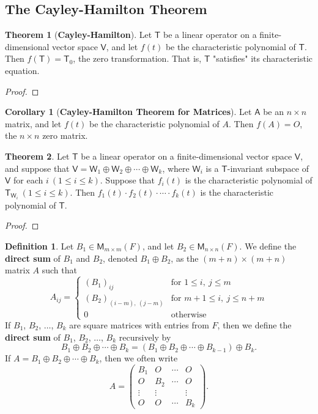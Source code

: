 \documentclass[12pt]{book}
\theoremstyle{definition}
\newtheorem{theorem}{Theorem}[chapter]
\newtheorem*{corollary*}{Corollary}
\newtheorem*{definition}{Definition}
\begin{document}
	\subsection*{The Cayley-Hamilton Theorem}
	\begin{theorem}[\textbf{Cayley-Hamilton}]
		Let $\mathsf{T}$ be a linear operator on a finite-dimensional vector space $\mathsf{V}$, and let $f(t)$ be the characteristic polynomial of $\mathsf{T}$. Then $f(\mathsf{T})=\mathsf{T}_0$, the zero transformation. That is, $\mathsf{T}$ "satisfies" its characteristic equation.
	\end{theorem}
	\begin{proof}
	\end{proof}
	\vspace*{\fill}
	\begin{corollary*}[\textbf{Cayley-Hamilton Theorem for Matrices}]
		Let $\mathsf{A}$ be an $n\times n$ matrix, and let $f(t)$ be the characteristic polynomial of $A$. Then $f(A)=O$, the $n\times n$ zero matrix.
	\end{corollary*}
	\vspace*{\fill}
	\newpage
	\begin{theorem}
		Let $\mathsf{T}$ be a linear operator on a finite-dimensional vector space $\mathsf{V}$, and suppose that $\mathsf{V}=\mathsf{W}_1\oplus\mathsf{W}_2\oplus\cdots\oplus\mathsf{W}_k$, where $\mathsf{W}_i$ is a $\mathsf{T}$-invariant subspace of $\mathsf{V}$ for each $i\ (1\leq i \leq k).$ Suppose that $f_i(t)$ is the characteristic polynomial of $\mathsf{T}_{\mathsf{W}_i}\ (1\leq i \leq k).$ Then $f_1(t)\cdot f_2(t)\cdot \cdots \cdot f_k(t)$ is the characteristic polynomial of $\mathsf{T}$.
	\end{theorem}
	\begin{proof}
	\end{proof}
	\newpage
	\begin{definition}
		Let $B_1\in\mathsf{M}_{m \times m}(F)$, and let $B_2\in\mathsf{M}_{n\times n}(F)$. We define the \textbf{direct sum} of $B_1$ and $B_2$, denoted $B_1\oplus B_2$, as the $(m+n)\times(m+n)$ matrix $A$ such that
		$$A_{ij}=\begin{cases}
			(B_1)_{ij}&\text{for }1\leq i,\ j\leq m\\
			(B_2)_{(i-m),\ (j-m)}&\text{for }m+1\leq i,\ j\leq n+m\\
			0&\text{otherwise}
		\end{cases}$$
		If $B_1$, $B_2$, $\ldots$, $B_k$ are square matrices with entries from $F$, then we define the \textbf{direct sum} of $B_1$, $B_2$, $\ldots$, $B_k$ recursively by $$B_1\oplus B_2\oplus \cdots \oplus B_k=(B_1\oplus B_2\oplus\cdots\oplus B_{k-1})\oplus B_k.$$
		If $A=B_1\oplus B_2\oplus \cdots \oplus B_k$, then we often write
		$$A=\begin{pmatrix}
			B_1&O&\cdots&O\\
			O&B_2&\cdots&O\\
			\vdots&\vdots&&\vdots\\
			O&O&\cdots&B_k
		\end{pmatrix}.$$
	\end{definition}
\end{document}

